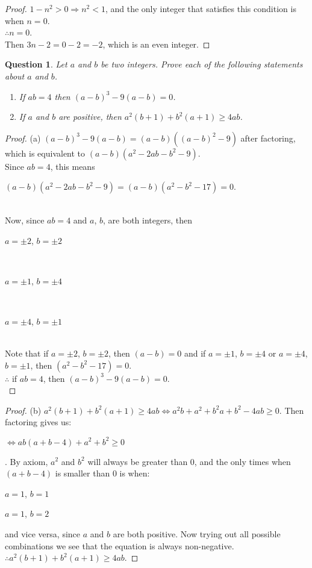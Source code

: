 \documentclass[11pt,oneside]{article}
\newtheorem{question}{Question}
\begin{document}
\begin{proof}
    $1 - n^2 > 0 \Rightarrow n^2 < 1$, and the only integer that satisfies this condition is when $n = 0$.\\
    $\therefore n = 0$.\\
    Then $3n - 2 = 0 - 2 = -2$, which is an even integer.
\end{proof}

\bigskip

\begin{question}
    Let $a$ and $b$ be two integers. Prove each of the following statements about $a$ and $b$. \\
    \begin{enumerate}
    	\item[(a)] If $ab = 4$ then $(a-b)^3 - 9(a-b) = 0$.
    	\item[(b)] If $a$ and $b$ are positive, then $a^2(b+1) + b^2(a+1) \geq 4ab$.  
    \end{enumerate}
\end{question}

\begin{proof}
	 (a) $(a-b)^3 - 9(a-b) = (a-b)((a-b)^2-9)$ after factoring, which is equivalent to $(a-b)(a^2 - 2ab - b^2 - 9)$.\\
	 Since $ab = 4$, this means \\
	 \centerline{$(a-b)(a^2 - 2ab - b^2 - 9) = (a-b)(a^2 - b^2 - 17) = 0$.} \\
	 Now, since $ab=4$ and $a$, $b$, are both integers, then\\
	 \centerline{$a=\pm2$, $b=\pm2$}\\
	 \centerline{$a=\pm1$, $b=\pm4$}\\
	 \centerline{$a=\pm4$, $b=\pm1$}\\
	 Note that if $a=\pm2$, $b=\pm2$, then $(a-b)=0$ and if $a=\pm1$, $b=\pm4$ or $a=\pm4$, $b=\pm1$, then $(a^2 - b^2 - 17) = 0$.\\
	 $\therefore$ if $ab = 4$, then $(a-b)^3 - 9(a-b) = 0$.
	 \\
\end{proof}
\begin{proof}
	(b) $a^2(b+1)+b^2(a+1) \geq 4ab \iff a^2b + a^2 + b^2a + b^2 - 4ab \geq 0$. Then factoring gives us: \\
	\centerline{$\iff ab(a+b-4) + a^2 + b^2 \geq 0 $}.
	By axiom, $a^2$ and $b^2$ will always be greater than 0, and the only times when $(a+b-4)$ is smaller than 0 is when: \\
	\centerline{$a=1$, $b=1$}
	\centerline{$a=1$, $b=2$}
	and vice versa, since $a$ and $b$ are both positive.
	Now trying out all possible combinations we see that the equation is always non-negative.\\
	$\therefore a^2(b+1)+b^2(a+1) \geq 4ab$.
\end{proof}
\end{document}
